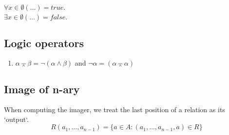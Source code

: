 \documentclass[twocolumn,a4paper]{article}
\begin{document}
\(\forall x\in\emptyset(\ldots) = true\). \\
\(\exists x\in\emptyset(\ldots) = false\).

\subsection*{Logic operators}
\begin{enumerate}
	\item $\alpha \barwedge \beta = \neg (\alpha \wedge \beta)$ and $\neg \alpha = (\alpha \barwedge \alpha)$
\end{enumerate}

\subsection*{Image of n-ary}
When computing the imager, we treat the last position of a relation as its `output`. 
\begin{equation}
	R(a_1, \ldots, a_{n-1}) = \{a \in A : (a_1, \ldots, a_{n-1}, a) \in R \}
\end{equation}
\end{document}

